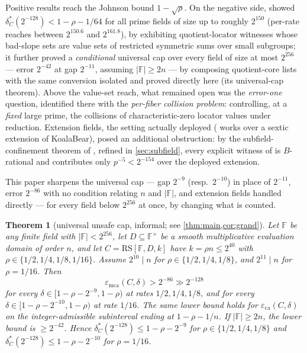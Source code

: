 \documentclass[11pt]{article}
\newtheorem{theorem}{Theorem}[section]
\theoremstyle{definition}
\theoremstyle{remark}
\newcommand{\F}{\mathbb{F}}
\newcommand{\B}{B}
\newcommand{\RS}{\mathrm{RS}}
\newcommand{\eca}{\varepsilon_{\mathrm{ca}}}
\newcommand{\emca}{\varepsilon_{\mathrm{mca}}}
\begin{document}
Positive results reach the Johnson bound $1-\sqrt\rho$. On the negative side, \cite{Cho26b} showed $\delta^*_C(2^{-128})<1-\rho-1/64$ for all prime fields of size up to roughly $2^{150}$ (per-rate reaches between $2^{150.6}$ and $2^{161.8}$), by exhibiting quotient-locator witnesses whose bad-slope sets are value sets of restricted symmetric sums over small subgroups; it further proved a \emph{conditional} universal cap over every field of size at most $2^{256}$ --- error $2^{-42}$ at gap $2^{-11}$, assuming $|\F|\ge2n$ --- by composing quotient-core lists with the same conversion isolated and proved directly here (its universal-cap theorem). Above the value-set reach, what remained open was the \emph{error-one} question, identified there with the \emph{per-fiber collision problem}: controlling, at a \emph{fixed} large prime, the collisions of characteristic-zero locator values under reduction. Extension fields, the setting actually deployed (\cite[\S6.3]{ABF26} works over a sextic extension of KoalaBear), posed an additional obstruction: by the subfield-confinement theorem of \cite{Cho26b}, refined in \cref{sec:subfield}, every explicit witness of \cite{Cho26a,Cho26b} is $\B$-rational and contributes only $p^{-5}<2^{-154}$ over the deployed extension.

This paper sharpens the universal cap --- gap $2^{-9}$ (resp.\ $2^{-10}$) in place of $2^{-11}$, error $2^{-86}$ with no condition relating $n$ and $|\F|$, and extension fields handled directly --- for every field below $2^{256}$ at once, by changing what is counted.


\begin{theorem}[universal unsafe cap, informal; see \cref{thm:main,cor:grand}]\label{thm:informal}
Let $\F$ be any finite field with $|\F|<2^{256}$, let $D\subseteq\F^\times$ be a smooth multiplicative evaluation domain of order $n$, and let $C=\RS[\F,D,k]$ have $k=\rho n\le2^{40}$ with $\rho\in\{1/2,1/4,1/8,1/16\}$. Assume $2^{10}\mid n$ for $\rho\in\{1/2,1/4,1/8\}$, and $2^{11}\mid n$ for $\rho=1/16$. Then
\[
\emca(C,\delta)>2^{-86}\gg2^{-128}
\]
for every $\delta\in[1-\rho-2^{-9},1-\rho)$ at rates $1/2,1/4,1/8$, and for every $\delta\in[1-\rho-2^{-10},1-\rho)$ at rate $1/16$. The same lower bound holds for $\eca(C,\delta)$ on the integer-admissible subinterval ending at $1-\rho-1/n$. If $|\F|\ge2n$, the lower bound is $\ge2^{-42}$. Hence $\delta^*_C(2^{-128})\le1-\rho-2^{-9}$ for $\rho\in\{1/2,1/4,1/8\}$ and $\delta^*_C(2^{-128})\le1-\rho-2^{-10}$ for $\rho=1/16$.
\end{theorem}
\end{document}
